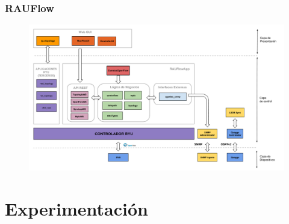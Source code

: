 \documentclass{beamer}
\begin{document}
\begin{frame}
\frametitle{RAUFlow} 

\begin{figure}[H]
\centering
\includegraphics[width=1.0\textwidth]{imagenes/rauflowarquitectura.png}
\end{figure}

\end{frame}

\section{Experimentaci\'on} 
\frame{\tableofcontents[currentsection]}
\end{document}
